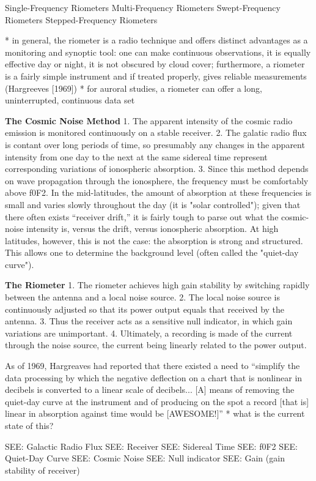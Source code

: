 
Single-Frequency Riometers
Multi-Frequency Riometers
Swept-Frequency Riometers
Stepped-Frequency Riometers


* in general, the riometer is a radio technique and 
offers distinct advantages as a monitoring and synoptic
tool: one can make continuous observations,  it is equally 
effective day or night, it is not obscured by cloud cover; furthermore,
a riometer is a fairly simple instrument and if treated properly, gives
reliable measurements (Hargreeves [1969])
* for auroral studies, a riometer can offer a long, uninterrupted,
continuous data set


\textbf{The Cosmic Noise Method}
1. The apparent intensity of the cosmic radio emission is monitored
continuously on a stable receiver.
2. The galatic radio flux is contant over long periods of time, so
presumably any changes in the apparent intensity from one day to the
next at the same sidereal time represent corresponding variations of
ionospheric absorption.
3. Since this method depends on wave propagation through the ionosphere,
the frequency must be comfortably above f0F2. In the mid-latitudes, the
amount of absorption at these frequencies is small and varies slowly throughout the day (it
is "solar controlled"); given that there often exists ``receiver
drift,'' it is fairly tough to parse out what the cosmic-noise intensity
is, versus the drift, versus ionospheric absorption. At high latitudes,
however, this is not the case: the absorption is strong and structured.
This allows one to determine the background level (often called the
"quiet-day curve"). 

\textbf{The Riometer}
1. The riometer achieves high gain stability by switching rapidly between
the antenna and a local noise source.
2. The local noise source is continuously adjusted so that its power output
equals that received by the antenna.
3. Thus the receiver acts as a sensitive null indicator, in which gain
variations are unimportant.
4. Ultimately, a recording is made of the current through the noise
source, the current being linearly related to the power output.

As of 1969, Hargreaves had reported that there existed a need to
``simplify the data processing by which the negative deflection on a
chart that is nonlinear in decibels is converted to a
linear scale of decibels... [A] means of removing the quiet-day curve at the
instrument and of producing on the spot a record [that is] linear in
absorption against time  would be [AWESOME!]''
* what is the current state of this?





SEE: Galactic Radio Flux
SEE: Receiver
SEE: Sidereal Time
SEE: f0F2
SEE: Quiet-Day Curve
SEE: Cosmic Noise
SEE: Null indicator
SEE: Gain (gain stability of receiver)

